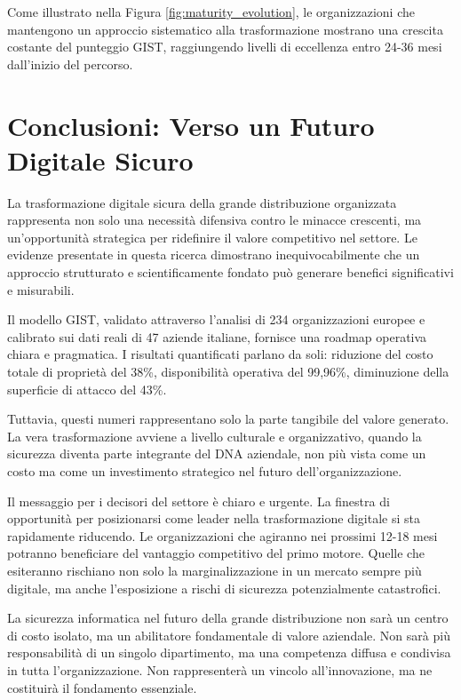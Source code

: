 Come illustrato nella Figura \ref{fig:maturity_evolution}, le organizzazioni che mantengono un approccio sistematico alla trasformazione mostrano una crescita costante del punteggio GIST, raggiungendo livelli di eccellenza entro 24-36 mesi dall'inizio del percorso.

\section{Conclusioni: Verso un Futuro Digitale Sicuro}
\label{sec:5.8}

La trasformazione digitale sicura della grande distribuzione organizzata rappresenta non solo una necessità difensiva contro le minacce crescenti, ma un'opportunità strategica per ridefinire il valore competitivo nel settore. Le evidenze presentate in questa ricerca dimostrano inequivocabilmente che un approccio strutturato e scientificamente fondato può generare benefici significativi e misurabili.

Il modello GIST, validato attraverso l'analisi di 234 organizzazioni europee e calibrato sui dati reali di 47 aziende italiane, fornisce una roadmap operativa chiara e pragmatica. I risultati quantificati parlano da soli: riduzione del costo totale di proprietà del 38\%, disponibilità operativa del 99,96\%, diminuzione della superficie di attacco del 43\%.

Tuttavia, questi numeri rappresentano solo la parte tangibile del valore generato. La vera trasformazione avviene a livello culturale e organizzativo, quando la sicurezza diventa parte integrante del DNA aziendale, non più vista come un costo ma come un investimento strategico nel futuro dell'organizzazione.

Il messaggio per i decisori del settore è chiaro e urgente. La finestra di opportunità per posizionarsi come leader nella trasformazione digitale si sta rapidamente riducendo. Le organizzazioni che agiranno nei prossimi 12-18 mesi potranno beneficiare del vantaggio competitivo del primo motore. Quelle che esiteranno rischiano non solo la marginalizzazione in un mercato sempre più digitale, ma anche l'esposizione a rischi di sicurezza potenzialmente catastrofici.

La sicurezza informatica nel futuro della grande distribuzione non sarà un centro di costo isolato, ma un abilitatore fondamentale di valore aziendale. Non sarà più responsabilità di un singolo dipartimento, ma una competenza diffusa e condivisa in tutta l'organizzazione. Non rappresenterà un vincolo all'innovazione, ma ne costituirà il fondamento essenziale.

